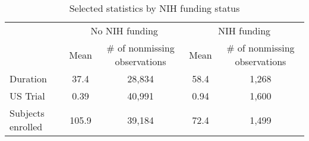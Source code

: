 \begin{table}[htbp]\centering
\def\sym#1{\ifmmode^{#1}\else\(^{#1}\)\fi}
\caption{Selected statistics by NIH funding status}
\begin{tabular}{l*{2}{cc}}
\hline\hline
            &\multicolumn{2}{c}{No NIH funding}&\multicolumn{2}{c}{NIH funding}\\
            &        Mean&\# of nonmissing observations&        Mean&\# of nonmissing observations\\
\hline
Duration    &        37.4&      28,834&        58.4&       1,268\\
US Trial    &        0.39&      40,991&        0.94&       1,600\\
Subjects enrolled&       105.9&      39,184&        72.4&       1,499\\
\hline\hline
\end{tabular}
\end{table}
